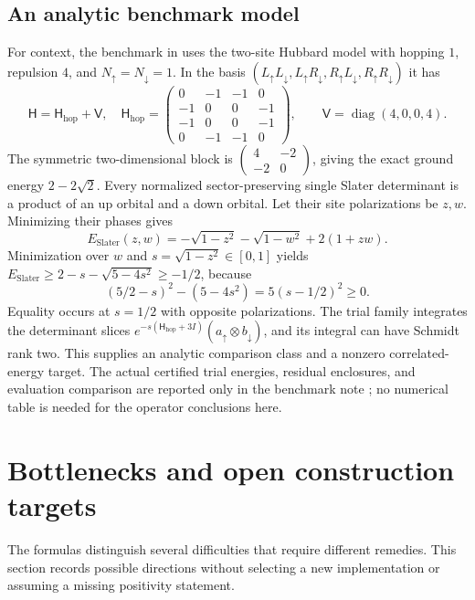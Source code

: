 \documentclass[11pt]{article}
\numberwithin{equation}{section}
\theoremstyle{definition}
\theoremstyle{remark}
\begin{document}
\subsection{An analytic benchmark model}
For context, the benchmark in \cite{hubbardnote} uses the two-site
Hubbard model with hopping $1$, repulsion $4$, and
$N_\uparrow=N_\downarrow=1$.  In the basis
$(L_\uparrow L_\downarrow,L_\uparrow R_\downarrow,
R_\uparrow L_\downarrow,R_\uparrow R_\downarrow)$ it has
\begin{equation}
 \mathsf H=\mathsf H_{\mathrm{hop}}+\mathsf V,\quad
 \mathsf H_{\mathrm{hop}}=\begin{pmatrix}0&-1&-1&0\\-1&0&0&-1\\-1&0&0&-1\\0&-1&-1&0\end{pmatrix},
 \qquad \mathsf V=\operatorname{diag}(4,0,0,4).
\end{equation}
The symmetric two-dimensional block is
$\left(\begin{smallmatrix}4&-2\\-2&0\end{smallmatrix}\right)$,
giving the exact ground energy $2-2\sqrt2$.  Every normalized
sector-preserving single Slater determinant is a product of an up
orbital and a down orbital.  Let their site polarizations be $z,w$.
Minimizing their phases gives
\begin{equation}
 E_{\mathrm{Slater}}(z,w)
 =-\sqrt{1-z^2}-\sqrt{1-w^2}+2(1+zw).
\end{equation}
Minimization over $w$ and $s=\sqrt{1-z^2}\in[0,1]$ yields
$E_{\mathrm{Slater}}\ge2-s-\sqrt{5-4s^2}\ge-1/2$, because
\[
 (5/2-s)^2-(5-4s^2)=5(s-1/2)^2\ge0.
\]
Equality occurs at $s=1/2$ with opposite polarizations.  The trial
family integrates the determinant slices
$e^{-s(\mathsf H_{\mathrm{hop}}+3I)}(a_\uparrow\otimes b_\downarrow)$, and its integral
can have Schmidt rank two.  This supplies an analytic comparison
class and a nonzero correlated-energy target.  The actual certified
trial energies, residual enclosures, and evaluation comparison are
reported only in the benchmark note \cite{hubbardnote}; no numerical
table is needed for the operator conclusions here.

\section{Bottlenecks and open construction targets}\label{sec:bottlenecks}
The formulas distinguish several difficulties that require different
remedies. This section records possible directions without selecting a
new implementation or assuming a missing positivity statement.
\end{document}
